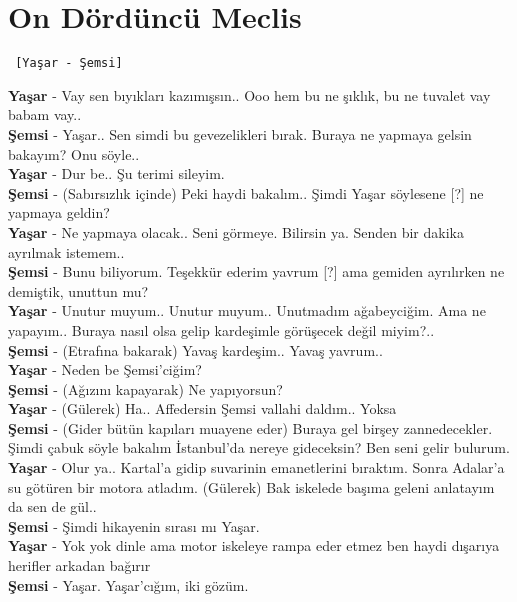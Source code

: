 \documentclass[]{book}
\begin{document}
\hypertarget{on-dorduncu-meclis-1}{%
\section{On Dördüncü Meclis}\label{on-dorduncu-meclis-1}}

\begin{verbatim}
 [Yaşar - Şemsi]
\end{verbatim}

\textbf{Yaşar} - Vay sen bıyıkları kazımışsın.. Ooo hem bu ne şıklık, bu ne tuvalet vay babam vay..\\
\textbf{Şemsi} - Yaşar.. Sen simdi bu gevezelikleri bırak. Buraya ne yapmaya gelsin bakayım? Onu söyle..\\
\textbf{Yaşar} - Dur be.. Şu terimi sileyim.\\
\textbf{Şemsi} - (Sabırsızlık içinde) Peki haydi bakalım.. Şimdi Yaşar söylesene {[}?{]} ne yapmaya geldin?\\
\textbf{Yaşar} - Ne yapmaya olacak.. Seni görmeye. Bilirsin ya. Senden bir dakika ayrılmak istemem..\\
\textbf{Şemsi} - Bunu biliyorum. Teşekkür ederim yavrum {[}?{]} ama gemiden ayrılırken ne demiştik, unuttun mu?\\
\textbf{Yaşar} - Unutur muyum.. Unutur muyum.. Unutmadım ağabeyciğim. Ama ne yapayım.. Buraya nasıl olsa gelip kardeşimle görüşecek değil miyim?..\\
\textbf{Şemsi} - (Etrafına bakarak) Yavaş kardeşim.. Yavaş yavrum..\\
\textbf{Yaşar} - Neden be Şemsi'ciğim?\\
\textbf{Şemsi} - (Ağızını kapayarak) Ne yapıyorsun?\\
\textbf{Yaşar} - (Gülerek) Ha.. Affedersin Şemsi vallahi daldım.. Yoksa\\
\textbf{Şemsi} - (Gider bütün kapıları muayene eder) Buraya gel birşey zannedecekler. Şimdi çabuk söyle bakalım İstanbul'da nereye gideceksin? Ben seni gelir bulurum.\\
\textbf{Yaşar} - Olur ya.. Kartal'a gidip suvarinin emanetlerini bıraktım. Sonra Adalar'a su götüren bir motora atladım. (Gülerek) Bak iskelede başıma geleni anlatayım da sen de gül..\\
\textbf{Şemsi} - Şimdi hikayenin sırası mı Yaşar.\\
\textbf{Yaşar} - Yok yok dinle ama motor iskeleye rampa eder etmez ben haydi dışarıya herifler arkadan bağırır\\
\textbf{Şemsi} - Yaşar. Yaşar'cığım, iki gözüm.\\
\end{document}
